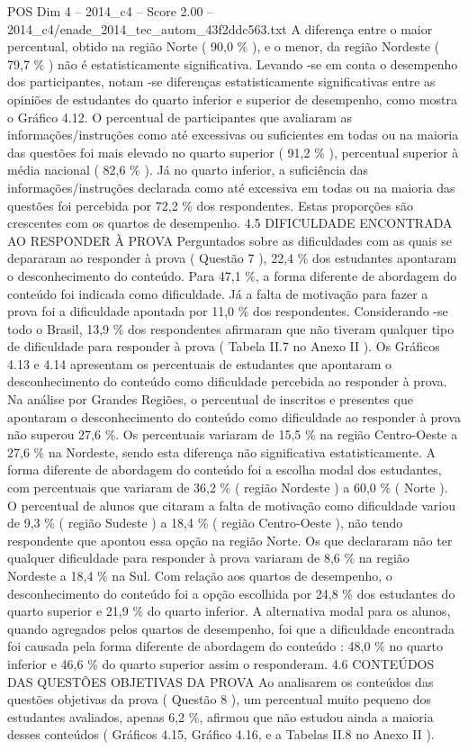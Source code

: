 \begin{textsample}{POS Dim 4 – 2014\_c4 – Score 2.00 – 2014\_c4/enade\_2014\_tec\_autom\_43f2ddc563.txt}
A diferença entre o maior percentual, obtido na região Norte ( 90,0 \% ), e o menor, da região Nordeste ( 79,7 \% ) não é estatisticamente significativa.
Levando -se em conta o desempenho dos participantes, notam -se diferenças estatisticamente significativas entre as opiniões de estudantes do quarto inferior e superior de desempenho, como mostra o Gráfico 4.12.
O percentual de participantes que avaliaram as informações/instruções como até excessivas ou suficientes em todas ou na maioria das questões foi mais elevado no quarto superior ( 91,2 \% ), percentual superior à média nacional ( 82,6 \% ).
Já no quarto inferior, a suficiência das informações/instruções declarada como até excessiva em todas ou na maioria das questões foi percebida por 72,2 \% dos respondentes.
Estas proporções são crescentes com os quartos de desempenho. 4.5 DIFICULDADE ENCONTRADA AO RESPONDER À PROVA Perguntados sobre as dificuldades com as quais se depararam ao responder à prova ( Questão 7 ), 22,4 \% dos estudantes apontaram o desconhecimento do conteúdo.
Para 47,1 \%, a forma diferente de abordagem do conteúdo foi indicada como dificuldade.
Já a falta de motivação para fazer a prova foi a dificuldade apontada por 11,0 \% dos respondentes.
Considerando -se todo o Brasil, 13,9 \% dos respondentes afirmaram que não tiveram qualquer tipo de dificuldade para responder à prova ( Tabela II.7 no Anexo II ).
Os Gráficos 4.13 e 4.14 apresentam os percentuais de estudantes que apontaram o desconhecimento do conteúdo como dificuldade percebida ao responder à prova.
Na análise por Grandes Regiões, o percentual de inscritos e presentes que apontaram o desconhecimento do conteúdo como dificuldade ao responder à prova não superou 27,6 \%.
Os percentuais variaram de 15,5 \% na região Centro-Oeste a 27,6 \% na Nordeste, sendo esta diferença não significativa estatisticamente.
A forma diferente de abordagem do conteúdo foi a escolha modal dos estudantes, com percentuais que variaram de 36,2 \% ( região Nordeste ) a 60,0 \% ( Norte ).
O percentual de alunos que citaram a falta de motivação como dificuldade variou de 9,3 \% ( região Sudeste ) a 18,4 \% ( região Centro-Oeste ), não tendo respondente que apontou essa opção na região Norte.
Os que declararam não ter qualquer dificuldade para responder à prova variaram de 8,6 \% na região Nordeste a 18,4 \% na Sul.
Com relação aos quartos de desempenho, o desconhecimento do conteúdo foi a opção escolhida por 24,8 \% dos estudantes do quarto superior e 21,9 \% do quarto inferior.
A alternativa modal para os alunos, quando agregados pelos quartos de desempenho, foi que a dificuldade encontrada foi causada pela forma diferente de abordagem do conteúdo : 48,0 \% no quarto inferior e 46,6 \% do quarto superior assim o responderam. 4.6 CONTEÚDOS DAS QUESTÕES OBJETIVAS DA PROVA Ao analisarem os conteúdos das questões objetivas da prova ( Questão 8 ), um percentual muito pequeno dos estudantes avaliados, apenas 6,2 \%, afirmou que não estudou ainda a maioria desses conteúdos ( Gráficos 4.15, Gráfico 4.16, e a Tabelas II.8 no Anexo II ).

\end{textsample}
